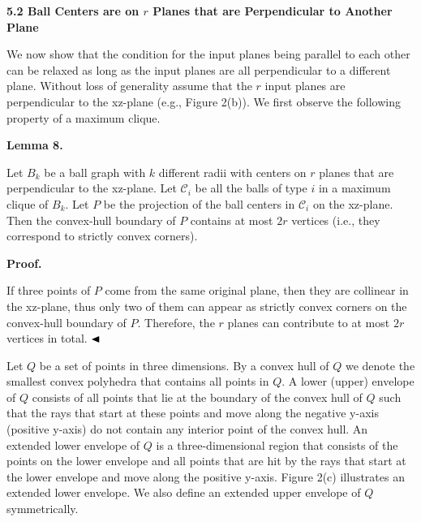\documentclass[10pt,a4paper]{amsart}
\begin{document}
\par
\par
\par
\par
\par
\par\medskip\noindent\textbf{5.2 Ball Centers are on $r$ Planes that are Perpendicular to Another Plane}\par
We now show that the condition for the input planes being parallel to each other can be relaxed as long as the input planes are all perpendicular to a different plane. Without loss of generality assume that the $r$ input planes are perpendicular to the xz-plane (e.g., Figure 2(b)). We first observe the following property of a maximum clique.
\par
\par
\par\medskip\noindent\textbf{Lemma 8.}\par
Let $B_{k}$ be a ball graph with $k$ different radii with centers on $r$ planes that are perpendicular to the xz-plane. Let $\mathcal{C}_{i}$ be all the balls of type $i$ in a maximum clique of $B_{k}$. Let $P$ be the projection of the ball centers in $\mathcal{C}_{i}$ on the xz-plane. Then the convex-hull boundary of $P$ contains at most $2r$ vertices (i.e., they correspond to strictly convex corners).
\par
\par
\par
\par\medskip\noindent\textbf{Proof.}\par
If three points of $P$ come from the same original plane, then they are collinear in the xz-plane, thus only two of them can appear as strictly convex corners on the convex-hull boundary of $P$. Therefore, the $r$ planes can contribute to at most $2r$ vertices in total. $\hfill\blacktriangleleft$
\par
\par
Let $Q$ be a set of points in three dimensions. By a convex hull of $Q$ we denote the smallest convex polyhedra that contains all points in $Q$. A lower (upper) envelope of $Q$ consists of all points that lie at the boundary of the convex hull of $Q$ such that the rays that start at these points and move along the negative y-axis (positive y-axis) do not contain any interior point of the convex hull. An extended lower envelope of $Q$ is a three-dimensional region that consists of the points on the lower envelope and all points that are hit by the rays that start at the lower envelope and move along the positive y-axis. Figure 2(c) illustrates an extended lower envelope. We also define an extended upper envelope of $Q$ symmetrically.
\end{document}
